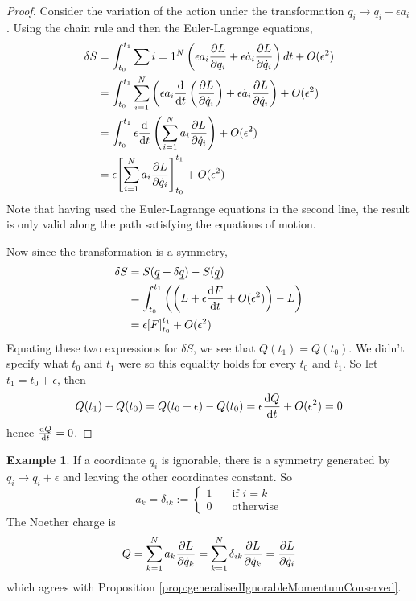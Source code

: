 \documentclass[12pt,a4paper]{article}
\theoremstyle{definition}
\newtheorem{example}[definition]{Example}
\begin{document}
\begin{proof}
	Consider the variation of the action under the transformation $q_i \rightarrow q_i + \epsilon a_i$. Using the chain rule and then the Euler-Lagrange equations,
	\[
		\begin{aligned}
			\delta S
				& = \int_{t_0}^{t_1} \sum{i = 1}^N \left( \epsilon a_i \diffp{L}{q_i} + \epsilon \dot{a}_i \diffp{L}{\dot{q}_i} \right) dt + O(\epsilon^2) \\
				& = \int_{t_0}^{t_1} \sum_{i = 1}^N \left( \epsilon a_i \diff{}{t} \left( \diffp{L}{\dot{q}_i} \right) + \epsilon \dot{a}_i \diffp{L}{\dot{q}_i} \right) + O(\epsilon^2) \\
				& = \int_{t_0}^{t_1} \epsilon \diff{}{t} \left( \sum_{i = 1}^N a_i \diffp{L}{\dot{q}_i} \right) + O(\epsilon^2) \\
				& = \epsilon {\left[ \sum_{i = 1}^N a_i \diffp{L}{\dot{q}_i} \right]}_{t_0}^{t_1} + O(\epsilon^2)
		\end{aligned}
	\]
	Note that having used the Euler-Lagrange equations in the second line, the result is only valid along the path satisfying the equations of motion.

	Now since the transformation is a symmetry,
	\[
		\begin{aligned}
			\delta S
				& = S(\underline{q} + \delta \underline{q}) - S(\underline{q}) \\
				& = \int_{t_0}^{t_1} \left( \left( L + \epsilon \diff{F}{t} + O(\epsilon^2) \right) - L \right) \\
				& = \epsilon {[F]}_{t_0}^{t_1} + O(\epsilon^2)
		\end{aligned}
	\]
	Equating these two expressions for $\delta S$, we see that $Q(t_1) = Q(t_0)$. We didn't specify what $t_0$ and $t_1$ were so this equality holds for every $t_0$ and $t_1$. So let $t_1 = t_0 + \epsilon$, then
	\[
		Q(t_1) - Q(t_0) = Q(t_0 + \epsilon) - Q(t_0) = \epsilon \diff{Q}{t} + O(\epsilon^2) = 0
	\]
	hence $\diff{Q}{t} = 0$.
\end{proof}

\begin{example}
	If a coordinate $q_i$ is ignorable, there is a symmetry generated by $q_i \rightarrow q_i + \epsilon$ and leaving the other coordinates constant. So
	\[
		a_k = \delta_{ik} := \begin{cases}
			1 & \quad \text{if } i = k \\
			0 & \quad \text{otherwise}
		\end{cases}
	\]
	The Noether charge is
	\[
		Q = \sum_{k = 1}^{N} a_k \diffp{L}{\dot{q}_k} = \sum_{k = 1}^{N} \delta_{ik} \diffp{L}{\dot{q}_k} = \diffp{L}{\dot{q}_i}
	\]
	which agrees with Proposition \ref{prop:generalisedIgnorableMomentumConserved}.
\end{example}
\end{document}
